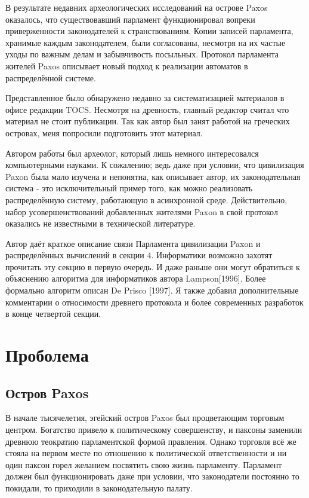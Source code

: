 В результате недавних археологических исследований на острове Paxos оказалось, что существовавший парламент функционировал вопреки приверженности законодателей к странствованиям. Копии записей парламента, хранимые каждым законодателем, были согласованы, несмотря на их частые уходы по важным делам и забывчивость посыльных. Протокол парламента жителей Paxos описывает новый подход к реализации автоматов в распределённой системе.

Представленное было обнаружено недавно за систематизацией материалов в офисе редакции TOCS. Несмотря на древность, главный редактор считал что материал не стоит публикации. Так как автор был занят работой на греческих островах, меня попросили подготовить этот материал.

Автором работы был археолог, который лишь немного интересовался компьютерными науками. К сожалению; ведь даже при условии, что цивилизация Paxon была мало изучена и непонятна, как описывает автор, их законодательная система - это исключительный пример того, как можно реализовать распределённую систему, работающую в асинхронной среде. Действительно, набор усовершенствований добавленных жителями Paxon в свой протокол оказались не известными в технической литературе.

Автор даёт краткое описание связи Парламента цивилизации Paxon и распределённых вычислений в секции 4. Информатики возможно захотят прочитать эту секцию в первую очередь. И даже раньше они могут обратиться к объяснению алгоритма для информатиков автора Lampson[1996]. Более формально алгоритм описан De Prisco [1997]. Я также добавил дополнительные комментарии о относимости древнего протокола и более современных разработок в конце четвертой секции.


\section{Проболема}
\subsection{Остров Paxos}

В начале тысячелетия, эгейский остров Paxos был процветающим торговым центром. Богатство привело к политическому совершенству, и паксоны заменили древнюю теократию парламентской формой правления. Однако торговля всё же стояла на первом месте по отношению к политической ответственности и ни один паксон горел желанием посвятить свою жизнь парламенту. Парламент должен был функционировать даже при условии, что законодатели постоянно то покидали, то приходили в законодательную палату.

